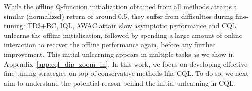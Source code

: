 
While the offline Q-function initialization obtained from all methods attains a similar (normalized) return of around 0.5, they suffer from difficulties during fine-tuning: TD3+BC, IQL, AWAC attain slow asymptotic performance and CQL unlearns the offline initialization, followed by spending a large amount of online interaction to recover the offline performance again, before any further improvement. This initial unlearning appears in multiple tasks as we show in Appendix~\ref{app:cql_dip_zoom_in}. In this work, we focus on developing effective fine-tuning strategies on top of conservative methods like CQL. To do so, we next aim to understand the potential reason behind the initial unlearning in CQL.  

